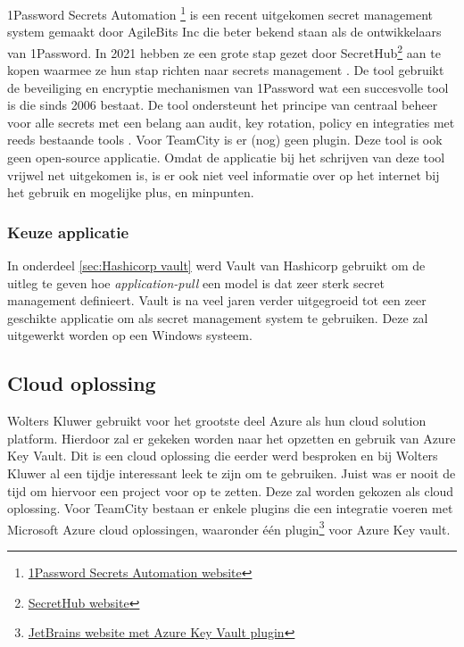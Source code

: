 1Password Secrets Automation \footnote{\href{https://1password.com/secrets/}{1Password Secrets Automation website}} is een recent uitgekomen secret management system gemaakt door AgileBits Inc die beter bekend staan als de ontwikkelaars van 1Password. In 2021 hebben ze een grote stap gezet door SecretHub\footnote{\href{https://secrethub.io/}{SecretHub website}} aan te kopen waarmee ze hun stap richten naar secrets management \autocite{Schoonen2021}. De tool gebruikt de beveiliging en encryptie mechanismen van 1Password wat een succesvolle tool is die sinds 2006 bestaat. De tool ondersteunt het principe van centraal beheer voor alle secrets met een belang aan audit, key rotation, policy en integraties met reeds bestaande tools \autocite{Shiner2021}. Voor TeamCity is er (nog) geen plugin. Deze tool is ook geen open-source applicatie. Omdat de applicatie bij het schrijven van deze tool vrijwel net uitgekomen is, is er ook niet veel informatie over op het internet bij het gebruik en mogelijke plus, en minpunten.

\subsubsection{Keuze applicatie}

In onderdeel \ref{sec:Hashicorp vault} werd Vault van Hashicorp gebruikt om de uitleg te geven hoe \textit{application-pull} een model is dat zeer sterk secret management definieert. Vault is na veel jaren verder uitgegroeid tot een zeer geschikte applicatie om als secret management system te gebruiken. Deze zal uitgewerkt worden op een Windows systeem.


\subsection{Cloud oplossing}

Wolters Kluwer gebruikt voor het grootste deel Azure als hun cloud solution platform. Hierdoor zal er gekeken worden naar het opzetten en gebruik van Azure Key Vault. Dit is een cloud oplossing die eerder werd besproken en bij Wolters Kluwer al een tijdje interessant leek te zijn om te gebruiken. Juist was er nooit de tijd om hiervoor een project voor op te zetten. Deze zal worden gekozen als cloud oplossing. Voor TeamCity bestaan er enkele plugins die een integratie voeren met Microsoft Azure cloud oplossingen, waaronder één plugin\footnote{\href{https://plugins.jetbrains.com/plugin/11373-azure-key-vault-support}{JetBrains website met Azure Key Vault plugin}} voor Azure Key vault.
